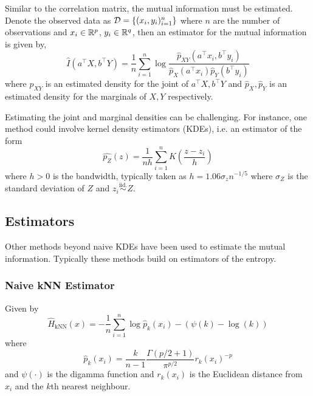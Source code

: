 \documentclass[12pt]{article}
\begin{document}
Similar to the correlation matrix, the mutual information must be estimated. Denote the observed data as $\mathcal{D} = \{ (x_i, y_i)_{i=1}^n \} $ where $ n $ are the number of observations and $x_i \in \mathbb{R}^p$, $y_i \in \mathbb{R}^q$, then an estimator for the mutual information is given by,
\begin{equation}
    \widehat{I}(a^\top X, b^\top Y) = \frac{1}{n} \sum_{i=1}^{n} \log \frac{\widehat{p}_{XY}(a^\top x_i, b^\top y_i)}{\widehat{p}_X(a^\top x_i)\widehat{p}_Y(b^\top y_i)}
\end{equation}
where $\widehat{p}_{XY}$ is an estimated density for the joint of $a^\top X, b^\top Y$ and $\widehat{p}_X, \widehat{p}_Y$ is an estimated density for the marginals of $X, Y$ respectively.

Estimating the joint and marginal densities can be challenging. For instance, one method could involve kernel density estimators (KDEs), i.e. an estimator of the form
\begin{equation}
\widehat{p_Z}(z) = \frac{1}{nh} \sum_{i=1}^{n} K \left( \frac{z - z_i}{h} \right)
\end{equation}
where $h>0$ is the bandwidth, typically taken as $h=1.06 \sigma_z n^{-1/5}$ where $\sigma_Z$ is the standard deviation of $Z$ and $ z_i \overset{\text{iid.}}{\sim} Z $.


\subsection{Estimators}

Other methods beyond naive KDEs have been used to estimate the mutual information. Typically these methods build on estimators of the entropy.

\subsubsection{Naive kNN Estimator}
\newcommand{\Hknn}{\widehat{H}_{\text{kNN}}}

Given by
\begin{equation}
\Hknn (x) = - \frac{1}{n} \sum_{i=1}^{n} \log \widehat{p}_k \left( x_i \right) - (\psi(k) - \log(k))
\end{equation}
where 
\begin{equation}
\widehat{p}_k(x_i) = \frac{k}{n - 1}\frac{\Gamma (p / 2 + 1)}{\pi^{p /2}} r_k (x_i)^{-p}
\end{equation}
and $\psi(\cdot)$ is the digamma function and $r_k(x_i)$ is the Euclidean distance from $x_i$ and the $k$th nearest neighbour.
\end{document}
